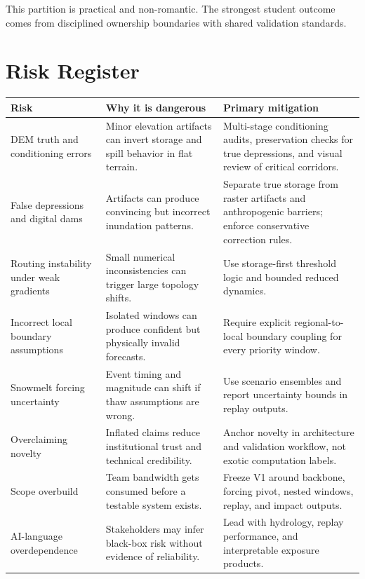 \documentclass[11pt]{article}
\begin{document}
This partition is practical and non-romantic. The strongest student outcome comes from disciplined ownership boundaries with shared validation standards.

\section{Risk Register}

\begin{tabularx}{\textwidth}{@{}p{}Y Y@{}}
\toprule
\textbf{Risk} & \textbf{Why it is dangerous} & \textbf{Primary mitigation} \\
\midrule
DEM truth and conditioning errors
& Minor elevation artifacts can invert storage and spill behavior in flat terrain.
& Multi-stage conditioning audits, preservation checks for true depressions, and visual review of critical corridors. \\

False depressions and digital dams
& Artifacts can produce convincing but incorrect inundation patterns.
& Separate true storage from raster artifacts and anthropogenic barriers; enforce conservative correction rules. \\

Routing instability under weak gradients
& Small numerical inconsistencies can trigger large topology shifts.
& Use storage-first threshold logic and bounded reduced dynamics. \\

Incorrect local boundary assumptions
& Isolated windows can produce confident but physically invalid forecasts.
& Require explicit regional-to-local boundary coupling for every priority window. \\

Snowmelt forcing uncertainty
& Event timing and magnitude can shift if thaw assumptions are wrong.
& Use scenario ensembles and report uncertainty bounds in replay outputs. \\

Overclaiming novelty
& Inflated claims reduce institutional trust and technical credibility.
& Anchor novelty in architecture and validation workflow, not exotic computation labels. \\

Scope overbuild
& Team bandwidth gets consumed before a testable system exists.
& Freeze V1 around backbone, forcing pivot, nested windows, replay, and impact outputs. \\

AI-language overdependence
& Stakeholders may infer black-box risk without evidence of reliability.
& Lead with hydrology, replay performance, and interpretable exposure products. \\
\bottomrule
\end{tabularx}
\end{document}
